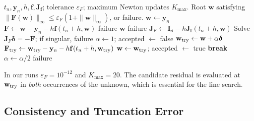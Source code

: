 \begin{algorithm}[htbp]
\caption{One Implicit Euler step with residual-decreasing damped Newton}
\label{alg:implicit_euler_newton}
\footnotesize
\begin{algorithmic}[1]
\Require $t_n,\mathbf y_n,h,\mathbf f,\mathbf J_{\mathbf f}$; tolerance
  $\varepsilon_F$; maximum Newton updates $K_{\max}$.
\Ensure Root $\mathbf w$ satisfying
  $\|\mathbf F(\mathbf w)\|_\infty\leq
  \varepsilon_F(1+\|\mathbf w\|_\infty)$, or failure.
\State $\mathbf w\gets\mathbf y_n$ 
    \State $\mathbf F\gets\mathbf w-\mathbf y_n-h\mathbf f(t_n+h,\mathbf w)$
        \State \Return failure
    \EndIf
        \State \Return $\mathbf w$
    \EndIf
        \State \Return failure
    \EndIf
    \State $\mathbf J_F\gets\mathbf I_d-h\mathbf J_{\mathbf f}(t_n+h,\mathbf w)$
    \State Solve $\mathbf J_F\boldsymbol\delta=-\mathbf F$;
           if singular, \Return failure
    \State $\alpha\gets1$; accepted $\gets$ false
        \State $\mathbf w_{\rm try}\gets\mathbf w+\alpha\boldsymbol\delta$
        \State $\mathbf F_{\rm try}\gets
          \mathbf w_{\rm try}-\mathbf y_n-h\mathbf f(t_n+h,\mathbf w_{\rm try})$
            \State $\mathbf w\gets\mathbf w_{\rm try}$; accepted $\gets$ true
            \State \textbf{break}
        \EndIf
        \State $\alpha\gets\alpha/2$
    \EndWhile
        \State \Return failure
    \EndIf
\EndFor
\end{algorithmic}
\end{algorithm}

In our runs $\varepsilon_F=10^{-12}$ and $K_{\max}=20$. The candidate
residual is evaluated at $\mathbf w_{\rm try}$ in \emph{both} occurrences of
the unknown, which is essential for the line search.



\subsection{Consistency and Truncation Error}

\label{sec:consistency_and_truncation_error}

